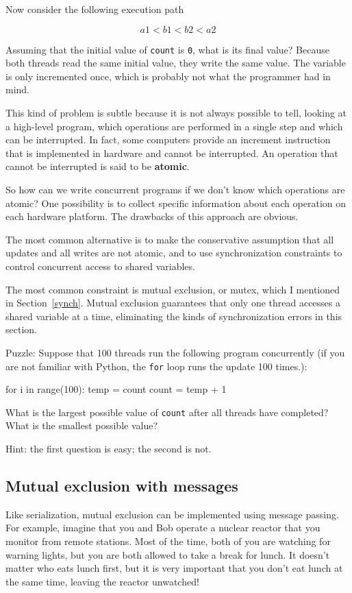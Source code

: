 \documentclass{book}
\begin{document}
Now consider the following execution path

\[  a1 < b1 < b2 < a2  \]

Assuming that the
initial value of {\tt count} is {\tt 0},
what is its final value?  Because
both threads read the same initial value, they write
the same value.  The variable is only incremented once, which
is probably not what the programmer had in mind.

This kind of problem is subtle because it is not always possible to
tell, looking at a high-level program, which operations are
performed in a single step and which can be interrupted.
In fact, some computers provide an increment instruction that
is implemented in hardware and cannot be interrupted.
An operation that cannot be interrupted is said to be
    {\bf atomic}.

So how can we write concurrent programs if we don't know which
operations are atomic?  One possibility is to collect specific
information about each operation on each hardware platform.
The drawbacks of this approach are obvious.

The most common alternative is to make the conservative
assumption that all updates and all writes are not atomic,
and to use synchronization constraints to control concurrent
access to shared variables.

The most common constraint is mutual exclusion, or mutex,
which I mentioned in Section~\ref{synch}.  Mutual exclusion guarantees
that only one thread accesses a shared variable at a time,
eliminating the kinds of synchronization errors in this section.

Puzzle: Suppose that 100 threads run the following program concurrently
(if you are not familiar with Python, the {\tt for} loop runs the update
100 times.):

\begin{unbreakable}[]{}
for i in range(100):
    temp = count
    count = temp + 1
\end{unbreakable}

What is the largest possible value of {\tt count} after all threads
have completed?  What is the smallest possible value?

Hint: the first question is easy; the second is not.

\subsection {Mutual exclusion with messages}

Like serialization, mutual exclusion
can be implemented using message passing.  For example, imagine that
you and Bob operate a nuclear reactor that you monitor from remote
stations.  Most of the time, both of you are watching for warning
lights, but you are both allowed to take a break for lunch.  It
doesn't matter who eats lunch first, but it is very important that
you don't eat lunch at the same time, leaving the reactor unwatched!
\end{document}
